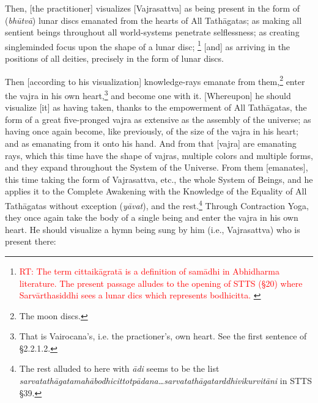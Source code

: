 \documentclass[11pt]{book}
\newcommand{\red}[1]{\textcolor{red}{#1}}
\newcommand{\skt}[1]{\emph{#1}}
\begin{document}
Then, [the practitioner] visualizes [Vajrasattva] as being present in the form of (\skt{bhūtvā}) lunar discs emanated from the hearts of All Tathāgatas; as making all sentient beings throughout all world-systems penetrate selflessness; as creating singleminded focus upon the shape of a lunar disc; \footnote{\red{RT: The term cittaikāgratā is a definition of samādhi in Abhidharma literature. The present passage alludes to the opening of STTS (§20) where Sarvārthasiddhi sees a lunar dics which represents bodhicitta. }} [and] as arriving in the positions of all deities, precisely in the form of lunar discs.

Then [according to his visualization] knowledge-rays emanate from them,\footnote{The moon discs.} enter the vajra in his own heart,\footnote{That is Vairocana's, i.e. the practioner's, own heart. See the first sentence of §2.2.1.2.} and become one with it. [Whereupon] he should visualize [it] as having taken, thanks to the empowerment of All Tathāgatas, the form of a great five-pronged vajra as extensive as the assembly of the universe; as having once again become, like previously, of the size of the vajra in his heart; and as emanating from it onto his hand. And from that [vajra] are emanating rays, which this time have the shape of vajras, multiple colors and multiple forms, and they expand throughout the System of the Universe. From them [emanates], this time taking the form of Vajrasattva, etc., the whole System of Beings, and he applies it to the Complete Awakening with the Knowledge of the Equality of All Tathāgatas without exception (\skt{yāvat}), and the rest.\footnote{The rest alluded to here with \skt{ādi} seems to be the list \skt{sarvatathāgatamahābodhicittotpādana{\ldots}sarvatathāgatarddhivikurvitāni} in STTS §39.} Through Contraction Yoga, they once again take the body of a single being and enter the vajra in his own heart. He should visualize a hymn being sung by him (i.e., Vajrasattva) who is present there:
\end{document}
